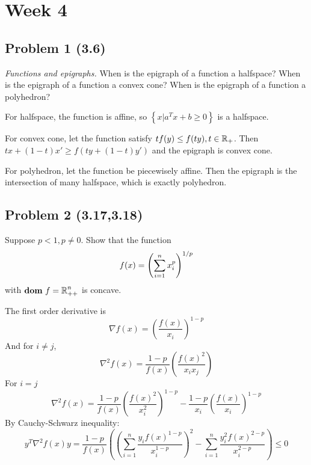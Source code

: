 \documentclass[en,hazy,blue,12pt,device = pad]{elegantnote}
\begin{document}
\section*{Week 4}
\subsection*{Problem 1 (3.6)}
\textit{Functions and epigraphs.} When is the epigraph of a function a halfspace? When is the epigraph of a function a convex cone? When is the epigraph of a function a polyhedron?

\begin{tcolorbox}
    \sol

    For halfspace, the function is affine, so \(\left\{x | a^T x + b \geq 0 \right\}\) is a halfspace.

    For convex cone, let the function satisfy \(tf(y) \leq f(ty), t \in \operatorname{\mathbb R}_+\). Then \(tx + (1-t) x' \geq f(ty+(1-t)y')\) and the epigraph is convex cone.

    For polyhedron, let the function be piecewisely affine. Then the epigraph is the intersection of many halfspace, which is exactly polyhedron.
\end{tcolorbox}

\subsection*{Problem 2 (3.17,3.18)}
Suppose \(p < 1, p \neq 0\). Show that the function
\[f(x) = \left( \sum_{i=1}^{n} x_i^p \right)^{1/p}\]
with \({\textbf{dom}\ } f = \operatorname{\mathbb R}_{++}^n\) is concave.

\begin{tcolorbox}
    \sol

            
    The first order derivative is 
    \[\nabla f(x) = \left( \frac{f(x)}{x_i} \right)^{1-p}\]
    And for \(i \neq j \),
    \[\nabla ^2 f(x) = \frac{1-p}{f(x)} \left( \frac{f(x)^2}{x_i x_j } \right)\]
    For \(i = j \)
    \[\nabla ^2 f(x) = \frac{1-p}{f(x)}\left(\frac{f(x)^2}{x_i^2}\right)^{1-p}-\frac{1-p}{x_i}\left(\frac{f(x)}{x_i}\right)^{1-p}\]
    By Cauchy-Schwarz inequality:
    \[y^T \nabla^2 f(x) y=\frac{1-p}{f(x)}\left(\left(\sum_{i=1}^n \frac{y_i f(x)^{1-p}}{x_i^{1-p}}\right)^2-\sum_{i=1}^n \frac{y_i^2 f(x)^{2-p}}{x_i^{2-p}}\right) \leq 0\]
\end{tcolorbox}
\end{document}
